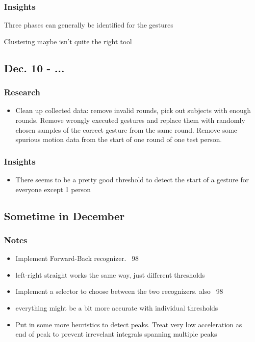 \documentclass{article}
\begin{document}
\subsubsection{Insights}
\begin{it}
\item Three phases can generally be identified for the gestures
\item Clustering maybe isn't quite the right tool
\end{it}
\subsection{Dec. 10 - ...}
\subsubsection{Research}
\begin{itemize}
    \item Clean up collected data: remove invalid rounds, pick out subjects with enough rounds. Remove wrongly executed gestures and replace them with randomly chosen samples of the correct gesture from the same round. Remove some spurious motion data from the start of one round of one test person.
\end{itemize}
\subsubsection{Insights}
\begin{itemize}
    \item There seems to be a pretty good threshold to detect the start of a gesture for everyone except 1 person
\end{itemize}
\subsection{Sometime in December}
\subsubsection{Notes}
\begin{itemize}
    \item Implement Forward-Back recognizer. ~98%
    \item left-right straight works the same way, just different thresholds
    \item Implement a selector to choose between the two recognizers. also ~98%
    \item everything might be a bit more accurate with individual thresholds
    \item Put in some more heuristics to detect peaks. Treat very low acceleration as end of peak to prevent irrevelant integrals spanning multiple peaks
\end{itemize}
\end{document}
